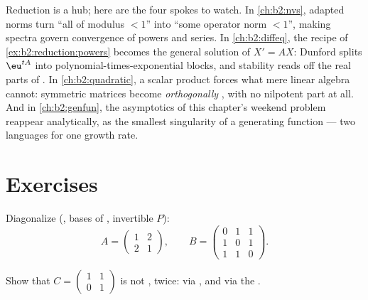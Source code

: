 \begin{remark}\label{rem:b2:reduction:perspectives}
Reduction is a hub; here are the four spokes to watch. In
\cref{ch:b2:nvs}, adapted norms turn ``all  of
modulus $< 1$'' into ``some operator norm $< 1$'', making
spectra govern convergence of powers and series. In
\cref{ch:b2:diffeq}, the recipe of
\cref{ex:b2:reduction:powers} becomes the general solution of
$X' = AX$: Dunford splits $\eu^{tA}$ into
polynomial-times-exponential blocks, and stability reads off
the real parts of . In \cref{ch:b2:quadratic}, a
scalar product forces what mere linear algebra cannot: symmetric
matrices become \emph{orthogonally} , with no
nilpotent part at all. And in \cref{ch:b2:genfun}, the
 asymptotics of this chapter's weekend
problem reappear analytically, as the smallest singularity of a
generating function --- two languages for one growth rate.
\end{remark}

\section{Exercises}

\begin{exercise}[$\star$]\label{exo:b2:reduction:1}
Diagonalize (, bases of , invertible $P$):
\[
A = \begin{pmatrix} 1 & 2\\ 2 & 1 \end{pmatrix},
\qquad
B = \begin{pmatrix} 0 & 1 & 1\\ 1 & 0 & 1\\ 1 & 1 & 0
\end{pmatrix}.
\]
\end{exercise}

\begin{exercise}[$\star$]\label{exo:b2:reduction:2}
Show that $C = \begin{pmatrix} 1 & 1\\ 0 & 1\end{pmatrix}$ is not
, twice: via , and via the .
\end{exercise}

